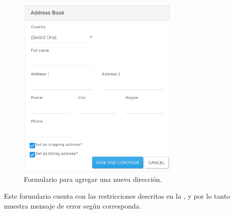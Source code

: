 		\begin{figure}[h!]
			\centering
			\includegraphics[width=0.7\textwidth]{figuras/address/form/add_new_address.png}
			\caption{Formulario para agregar una nueva dirección.}
			\label{figure:address:form:add_new_address}
		\end{figure}

		Este formulario cuenta con las restricciones descritas en la , y por lo tanto muestra mensaje de error según corresponda.

